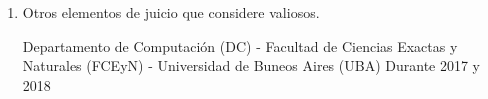 \begin{enumerate}[leftmargin=0.8cm]
  \item[e)]{Otros elementos de juicio que considere valiosos.
    \begin{itemize}[leftmargin=0.5cm]
    {Departamento de Computación (DC) - Facultad de Ciencias Exactas y Naturales (FCEyN) - Universidad de Buneos Aires (UBA)}
    {Durante 2017 y 2018}{}
    \end{itemize}
  }


\end{enumerate}

%
